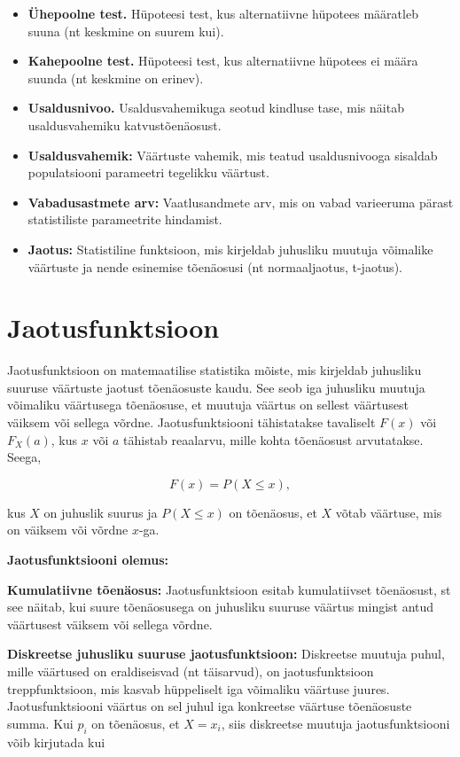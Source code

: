 \documentclass[
]{book}
\providecommand{\tightlist}{%
  \setlength{\itemsep}{0pt}\setlength{\parskip}{0pt}}
\begin{document}
\begin{itemize}
\tightlist
\item
  \textbf{Ühepoolne test.} Hüpoteesi test, kus alternatiivne hüpotees määratleb suuna (nt keskmine on suurem kui).
\item
  \textbf{Kahepoolne test.} Hüpoteesi test, kus alternatiivne hüpotees ei määra suunda (nt keskmine on erinev).
\item
  \textbf{Usaldusnivoo.} Usaldusvahemikuga seotud kindluse tase, mis näitab usaldusvahemiku katvustõenäosust.
\item
  \textbf{Usaldusvahemik:} Väärtuste vahemik, mis teatud usaldusnivooga sisaldab populatsiooni parameetri tegelikku väärtust.
\item
  \textbf{Vabadusastmete arv:} Vaatlusandmete arv, mis on vabad varieeruma pärast statistiliste parameetrite hindamist.
\item
  \textbf{Jaotus:} Statistiline funktsioon, mis kirjeldab juhusliku muutuja võimalike väärtuste ja nende esinemise tõenäosusi (nt normaaljaotus, t-jaotus).
\end{itemize}

\section{Jaotusfunktsioon}\label{jaotusfunktsioon}

Jaotusfunktsioon on matemaatilise statistika mõiste, mis kirjeldab juhusliku suuruse väärtuste jaotust tõenäosuste kaudu. See seob iga juhusliku muutuja võimaliku väärtusega tõenäosuse, et muutuja väärtus on sellest väärtusest väiksem või sellega võrdne. Jaotusfunktsiooni tähistatakse tavaliselt \(F(x)\) või \(F_X(a)\), kus \(x\) või \(a\) tähistab reaalarvu, mille kohta tõenäosust arvutatakse. Seega,

\[F(x) = P(X \leq x),\]

kus \(X\) on juhuslik suurus ja \(P(X \leq x)\) on tõenäosus, et \(X\) võtab väärtuse, mis on väiksem või võrdne \(x\)-ga.

\textbf{Jaotusfunktsiooni olemus:}

\textbf{Kumulatiivne tõenäosus:} Jaotusfunktsioon esitab kumulatiivset tõenäosust, st see näitab, kui suure tõenäosusega on juhusliku suuruse väärtus mingist antud väärtusest väiksem või sellega võrdne.

\textbf{Diskreetse juhusliku suuruse jaotusfunktsioon:} Diskreetse muutuja puhul, mille väärtused on eraldiseisvad (nt täisarvud), on jaotusfunktsioon treppfunktsioon, mis kasvab hüppeliselt iga võimaliku väärtuse juures. Jaotusfunktsiooni väärtus on sel juhul iga konkreetse väärtuse tõenäosuste summa. Kui \(p_i\) on tõenäosus, et \(X = x_i\), siis diskreetse muutuja jaotusfunktsiooni võib kirjutada kui
\end{document}

